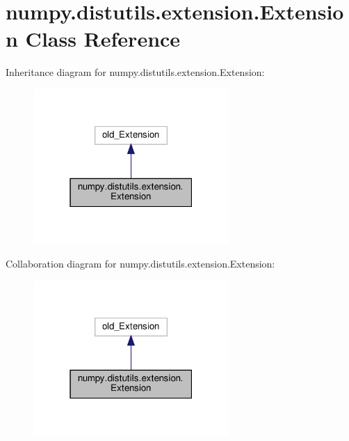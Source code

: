 \hypertarget{classnumpy_1_1distutils_1_1extension_1_1Extension}{}\section{numpy.\+distutils.\+extension.\+Extension Class Reference}
\label{classnumpy_1_1distutils_1_1extension_1_1Extension}


Inheritance diagram for numpy.\+distutils.\+extension.\+Extension\+:
\nopagebreak
\begin{figure}[H]
\begin{center}
\leavevmode
\includegraphics[width=211pt]{classnumpy_1_1distutils_1_1extension_1_1Extension__inherit__graph}
\end{center}
\end{figure}


Collaboration diagram for numpy.\+distutils.\+extension.\+Extension\+:
\nopagebreak
\begin{figure}[H]
\begin{center}
\leavevmode
\includegraphics[width=211pt]{classnumpy_1_1distutils_1_1extension_1_1Extension__coll__graph}
\end{center}
\end{figure}
